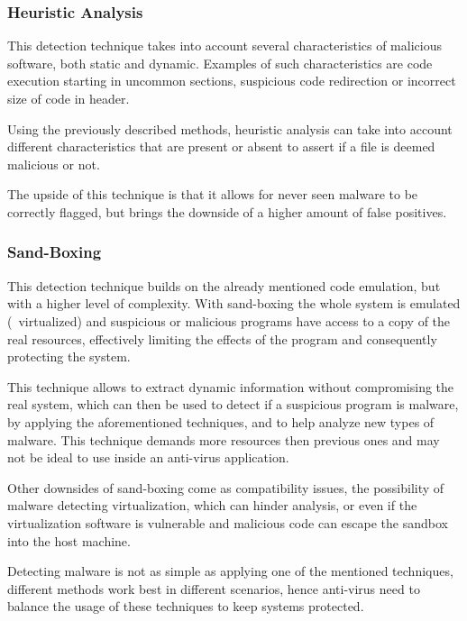 \subsubsection{Heuristic Analysis}
\label{subsection:heuristic_analysis}

This detection technique takes into account several characteristics of malicious software, both static and dynamic.
Examples of such characteristics are code execution starting in uncommon sections, suspicious code redirection or incorrect size of code in header.

Using the previously described methods, heuristic analysis can take into account different characteristics that are present or absent to assert if a file is deemed malicious or not.

The upside of this technique is that it allows for never seen malware to be correctly flagged, but brings the downside of a higher amount of false positives.

\subsubsection{Sand-Boxing}
\label{subsection:sand_boxing}

This detection technique builds on the already mentioned code emulation, but with a higher level of complexity.
With sand-boxing the whole system is emulated (\ie\ virtualized) and suspicious or malicious programs have access to a copy of the real resources, effectively limiting the effects of the program and consequently protecting the system.

This technique allows to extract dynamic information without compromising the real system, which can then be used to detect if a suspicious program is malware, by applying the aforementioned techniques, and to help analyze new types of malware.
This technique demands more resources then previous ones and may not be ideal to use inside an anti-virus application.

Other downsides of sand-boxing come as compatibility issues, the possibility of malware detecting virtualization, which can hinder analysis, or even if the virtualization software is vulnerable and malicious code can escape the sandbox into the host machine.

\medskip

Detecting malware is not as simple as applying one of the mentioned techniques, different methods work best in different scenarios, hence anti-virus need to balance the usage of these techniques to keep systems protected.

